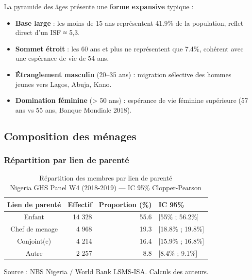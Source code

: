 \documentclass[
  10pt,
]{article}
\providecommand{\tightlist}{%
  \setlength{\itemsep}{0pt}\setlength{\parskip}{0pt}}\usepackage{longtable,booktabs,array}
\begin{document}
La pyramide des âges présente une \textbf{forme expansive} typique :

\begin{itemize}
\tightlist
\item
  \textbf{Base large} : les moins de 15 ans représentent 41.9\% de la
  population, reflet direct d'un ISF ≈ 5,3.
\item
  \textbf{Sommet étroit} : les 60 ans et plus ne représentent que 7.4\%,
  cohérent avec une espérance de vie de 54 ans.
\item
  \textbf{Étranglement masculin} (20--35 ans) : migration sélective des
  hommes jeunes vers Lagos, Abuja, Kano.
\item
  \textbf{Domination féminine} (\textgreater{} 50 ans) : espérance de
  vie féminine supérieure (57 ans vs 55 ans, Banque Mondiale 2018).
\end{itemize}

\newpage{}

\subsection{Composition des ménages}\label{composition-des-muxe9nages}

\subsubsection{Répartition par lien de
parenté}\label{ruxe9partition-par-lien-de-parentuxe9}

\begin{table}
\caption*{
{\fontsize{20}{25}\selectfont  Répartition des membres par lien de parenté\fontsize{8}{9}\selectfont } \\ 
{\fontsize{14}{17}\selectfont  Nigeria GHS Panel W4 (2018-2019) — IC 95\% Clopper-Pearson\fontsize{8}{9}\selectfont }
} 
\fontsize{8.0pt}{9.0pt}\selectfont
\begin{tabular*}{\linewidth}{@{\extracolsep{\fill}}crrl}
\toprule
Lien de parenté & Effectif & Proportion (\%) & IC 95\% \\ 
\midrule\addlinespace[2.5pt]
Enfant & 14 328 & 55.6 & [55\% ; 56.2\%] \\ 
Chef de menage & 4 968 & 19.3 & [18.8\% ; 19.8\%] \\ 
Conjoint(e) & 4 214 & 16.4 & [15.9\% ; 16.8\%] \\ 
Autre & 2 257 & 8.8 & [8.4\% ; 9.1\%] \\ 
\bottomrule
\end{tabular*}
\begin{minipage}{\linewidth}
\vspace{.05em}
Source : NBS Nigeria / World Bank LSMS-ISA. Calculs des auteurs.\\
\end{minipage}
\end{table}
\end{document}
